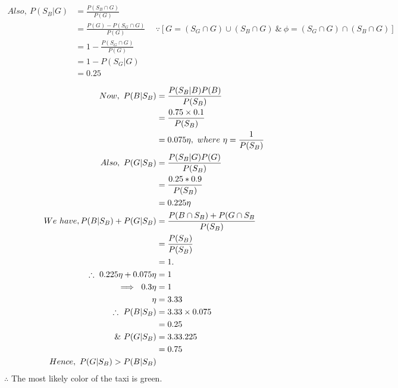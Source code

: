 \documentclass[a4paper,fleqn,11pt]{article}
\theoremstyle{mytheor}
\begin{document}
\begin{align*}
Also,\ P (S_B | G) & = \frac{P (S_B \cap G)}{P (G)} \\
& = \frac{P (G) - P (S_G \cap G)}{P (G)}\ &\
\because [G = (S_G \cap G) \cup (S_B \cap G)\ \&\ 
\phi = (S_G \cap G) \cap (S_B \cap G)] \\
& = 1 - \frac{P (S_G \cap G)}{P (G)} \\
& = 1 - P (S_G | G) \\
& = 0.25
\end{align*}

\begin{align*}
Now,\ P (B | S_B) & = \frac{P (S_B | B) P (B)}{P (S_B)} \\
& = \frac{0.75 \times 0.1}{P (S_B)} \\
& = 0.075\eta,\ where\ \eta = \frac{1}{P (S_B)} \\
Also,\ P (G | S_B) & = \frac{P (S_B | G) P (G)}{P (S_B)} \\
& = \frac{0.25 * 0.9}{P (S_B)} \\
& = 0.225\eta \\
We\ have, P (B|S_B) + P (G|S_B) & = \frac{P (B \cap S_B) + P (G \cap S_B}
										  {P (S_B)} \\
& = \frac{P (S_B)}{P (S_B)} \\
& = 1. \\
\therefore\ 0.225\eta + 0.075\eta & = 1 \\
\implies\ 0.3\eta & = 1 \\
\eta & = 3.33 \\
\therefore\ P (B|S_B) & = 3.33 \times 0.075 \\
& = 0.25 \\
\&\ P (G|S_B) & = 3.33 \time 0.225 \\
& = 0.75 \\
Hence,\ P (G|S_B) > P (B|S_B)
\end{align*}
$\therefore$ The most likely color of the taxi is green.
\section{}
\end{document}
